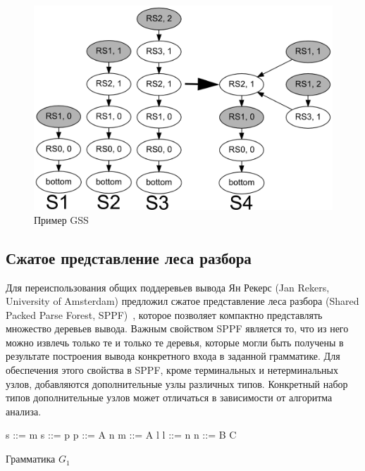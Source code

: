 \begin{figure}[H]
\begin{center}
\includegraphics[width=.8\textwidth]{pics/ex_gss.png}
\caption{Пример GSS}
\label{fig:gss} 
\end{center}
\end{figure}

\subsection{Сжатое представление леса разбора}

Для переиспользования общих поддеревьев вывода Ян Рекерс (Jan Rekers, University of Amsterdam) предложил сжатое представление леса разбора (Shared Packed Parse Forest, SPPF)~\cite{SPPF}, которое позволяет компактно представлять множество деревьев вывода. Важным свойством SPPF является то, что из него можно извлечь только те и только те деревья, которые могли быть получены в результате построения вывода конкретного входа в заданной грамматике. Для обеспечения этого свойства в SPPF, кроме терминальных и нетерминальных узлов, добавляются дополнительные узлы различных типов. Конкретный набор типов дополнительные узлов может отличаться в зависимости от алгоритма анализа.

\begin{listing}
    \begin{pyglist}[numbers=left,numbersep=5pt]

s ::= m 
s ::= p
p ::= A n
m ::= A l
l ::= n
n ::= B C

\end{pyglist}
\caption{Грамматика $G_1$}
\label{lst:g1}
\end{listing}


